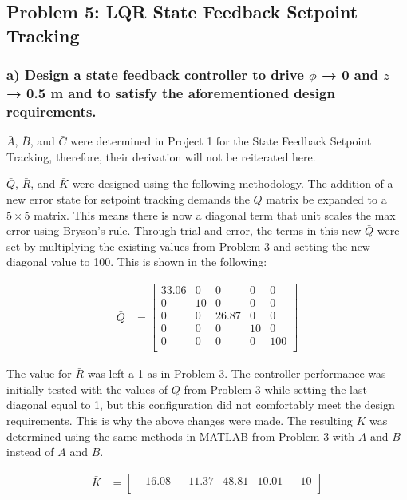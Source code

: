 \subsection*{Problem 5: LQR State Feedback Setpoint Tracking}
\subsubsection*{a) Design a state feedback controller to drive $\phi$ → 0 and $z$ → 0.5 m and to satisfy the aforementioned
    design requirements.}
$\bar{A}$, $\bar{B}$, and $\bar{C}$ were determined in Project 1 for the State Feedback Setpoint Tracking, therefore, their derivation will not be reiterated here.

$\bar{Q}$, $\bar{R}$, and $\bar{K}$ were designed using the following methodology. The addition of a new error state for setpoint tracking demands the $Q$ matrix be expanded to a $5\times5$ matrix. This means there is now a diagonal term that unit scales the max error using Bryson's rule. Through trial and error, the terms in this new $\bar{Q}$ were set by multiplying the existing values from Problem 3 and setting the new diagonal value to 100. This is shown in the following:

\begin{equation*}
    \begin{split}
        \bar{Q} & =
        \begin{bmatrix}
            33.06 & 0  & 0     & 0  & 0   \\
            0     & 10 & 0     & 0  & 0   \\
            0     & 0  & 26.87 & 0  & 0   \\
            0     & 0  & 0     & 10 & 0   \\
            0     & 0  & 0     & 0  & 100 \\
        \end{bmatrix}
    \end{split}
\end{equation*}

The value for $\bar{R}$ was left a 1 as in Problem 3. The controller performance was initially tested with the values of $Q$ from Problem 3 while setting the last diagonal equal to 1, but this configuration did not comfortably meet the design requirements. This is why the above changes were made. The resulting $\bar{K}$ was determined using the same methods in MATLAB from Problem 3 with $\bar{A}$ and $\bar{B}$ instead of $A$ and $B$.

\begin{equation*}
    \begin{split}
        \bar{K} & =
        \begin{bmatrix}
            -16.08 & -11.37 & 48.81 & 10.01 & -10 \\
        \end{bmatrix}
    \end{split}
\end{equation*}

